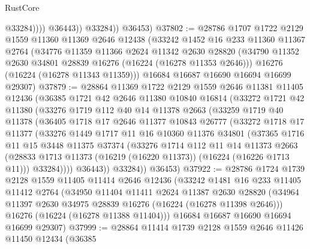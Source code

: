 \begin{lexlean}{RustCore}
\begin{coremodule}
                      @33284))))
              @36443))
          @33284))
      @36453)
@37802 := @28786
    @1707
    @1722
    @2129
    @1559
    @11360
    @11369
    @2646
    @12438
    (@33242
      @1452
      @16
      @233
      @11360
      @11367
      @2764
      (@34776
        @11359
        @11366
        @2624
        @11342
        @2630
        @28820
        (@34790 @11352 @2630 @34801 @28839 @16276 (@16224 (@16278 @11353 @2646)))
        @16276
        (@16224 (@16278 @11343 @11359)))
      @16684
      @16687
      @16690
      @16694
      @16699
      @29307)
@37879 := @28864
    @11369
    @1722
    @2129
    @1559
    @2646
    @11381
    @11405
    @12436
    (@36385
      @1721
      @42
      @2646
      @11380
      @10840
      @16814
      (@33272
        @1721
        @42
        @11380
        (@33276
          @1719
          @112
          @40
          @14
          @11378
          @2663
          (@33259
            @1719
            @40
            @11378
            (@36405
              @1718
              @17
              @2646
              @11377
              @10843
              @26777
              (@33272
                @1718
                @17
                @11377
                (@33276
                  @1449
                  @1717
                  @11
                  @16
                  @10360
                  @11376
                  @34801
                  (@37365
                    @1716
                    @11
                    @15
                    @3448
                    @11375
                    @37374
                    (@33276
                      @1714
                      @112
                      @11
                      @14
                      @11373
                      @2663
                      (@28833 @1713 @11373 (@16219 (@16220 @11373)) (@16224 (@16226 @1713 @11)))
                      @33284))))
              @36443))
          @33284))
      @36453)
@37922 := @28786
    @1724
    @1739
    @2128
    @1559
    @11405
    @11414
    @2646
    @12436
    (@33242
      @1481
      @16
      @233
      @11405
      @11412
      @2764
      (@34950
        @11404
        @11411
        @2624
        @11387
        @2630
        @28820
        (@34964 @11397 @2630 @34975 @28839 @16276 (@16224 (@16278 @11398 @2646)))
        @16276
        (@16224 (@16278 @11388 @11404)))
      @16684
      @16687
      @16690
      @16694
      @16699
      @29307)
@37999 := @28864
    @11414
    @1739
    @2128
    @1559
    @2646
    @11426
    @11450
    @12434
    (@36385

\end{coremodule}
\end{lexlean}

